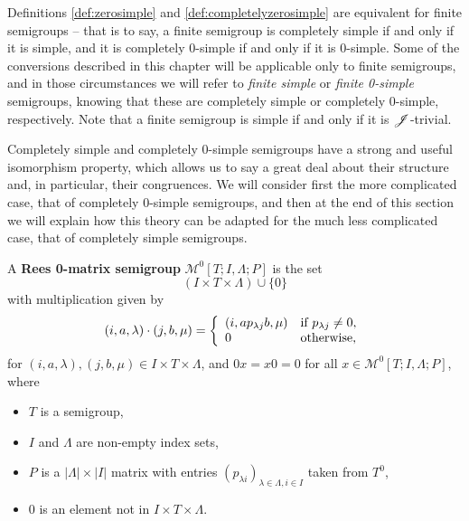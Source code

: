 Definitions \ref{def:zerosimple} and \ref{def:completelyzerosimple} are
equivalent for finite semigroups -- that is to say, a finite semigroup is
completely simple if and only if it is simple, and it is completely 0-simple if
and only if it is 0-simple.  Some of the conversions described in this chapter
will be applicable only to finite semigroups, and in those circumstances we will
refer to \textit{finite simple} or \textit{finite 0-simple} semigroups, knowing
that these are completely simple or completely 0-simple, respectively.
Note that a finite semigroup is simple if and only if it is $\mathrel{\mathscr{J}}$-trivial.

Completely simple and completely 0-simple semigroups have a strong and useful
isomorphism property, which allows us to say a great deal about their structure
and, in particular, their congruences.  We will consider first the more
complicated case, that of completely 0-simple semigroups, and then at the end of
this section we will explain how this theory can be adapted for the much less
complicated case, that of completely simple semigroups.

\begin{definition}
  \label{def:rzms}
  A \textbf{Rees 0-matrix semigroup} $\mathcal{M}^0[T;I,\Lambda;P]$ is the set
  $$(I \times T \times \Lambda) \cup \{0\}$$
  with multiplication given by
  $$(i,a,\lambda) \cdot (j,b,\mu) = \left\{
    \begin{array}{l l}
      (i,ap_{\lambda j}b, \mu) & \text{if~} p_{\lambda j} \neq 0, \\
      0 & \text{otherwise,}
    \end{array}
  \right.$$
  for $(i,a,\lambda), (j,b,\mu) \in I \times T \times \Lambda$, and $0x=x0=0$
  for all $x \in \mathcal{M}^0[T;I,\Lambda;P]$,
  where
  \begin{itemize}
  \item $T$ is a semigroup,
  \item $I$ and $\Lambda$ are non-empty index sets,
  \item $P$ is a $|\Lambda| \times |I|$ matrix with entries $(p_{\lambda
      i})_{\lambda \in \Lambda, i \in I}$
    taken from $T^0$,
  \item $0$ is an element not in $I \times T \times \Lambda$.
  \end{itemize}
\end{definition}

